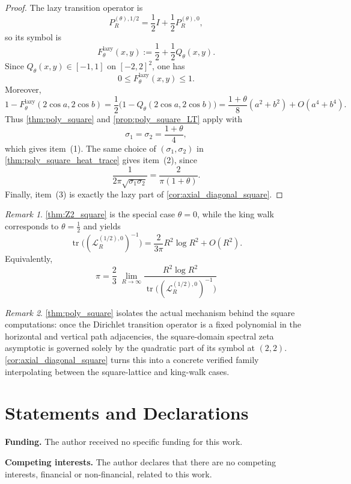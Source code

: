 \documentclass[reqno]{amsart}
\numberwithin{equation}{section}
\theoremstyle{definition}
\theoremstyle{remark}
\newtheorem{remark}[remark]{Remark}
\newcommand{\Cref}[1]{\autoref{#1}}
\DeclareMathOperator{\tr}{tr}
\begin{document}
\begin{proof}
The lazy transition operator is
\[
  P_R^{(\theta),1/2}
  =
  \frac12 I+\frac12 P_R^{(\theta),0},
\]
so its symbol is
\[
  F_\theta^{\mathrm{lazy}}(x,y)
  :=
  \frac12+\frac12 Q_\theta(x,y).
\]
Since $Q_\theta(x,y)\in[-1,1]$ on $[-2,2]^2$, one has
\[
  0\le F_\theta^{\mathrm{lazy}}(x,y)\le 1.
\]
Moreover,
\[
  1-F_\theta^{\mathrm{lazy}}(2\cos a,2\cos b)
  =
  \frac12\bigl(1-Q_\theta(2\cos a,2\cos b)\bigr)
  =
  \frac{1+\theta}{8}(a^2+b^2)+O(a^4+b^4).
\]
Thus \Cref{thm:poly_square} and \Cref{prop:poly_square_LT} apply with
\[
  \sigma_1=\sigma_2=\frac{1+\theta}{4},
\]
which gives item~(1). The same choice of $(\sigma_1,\sigma_2)$ in \Cref{thm:poly_square_heat_trace} gives item~(2), since
\[
  \frac{1}{2\pi\sqrt{\sigma_1\sigma_2}}
  =
  \frac{2}{\pi(1+\theta)}.
\]
Finally, item~(3) is exactly the lazy part of \Cref{cor:axial_diagonal_square}.
\end{proof}

\begin{remark}
\Cref{thm:Z2_square} is the special case $\theta=0$, while the king walk corresponds to $\theta=\frac12$ and yields
\[
  \tr\!\bigl((\mathcal L_R^{(1/2),0})^{-1}\bigr)
  =
  \frac{2}{3\pi}R^2\log R^2+O(R^2).
\]
Equivalently,
\begin{equation}\label{eq:King_pi}
\boxed{\;\displaystyle \pi=\frac{2}{3}\;\lim_{R\to\infty}\frac{R^{2}\log R^{2}}{\tr\!\bigl((\mathcal{L}_R^{(1/2),0})^{-1}\bigr)}\;}
\end{equation}
\end{remark}

\begin{remark}
\Cref{thm:poly_square} isolates the actual mechanism behind the square computations: once the Dirichlet transition operator is a fixed polynomial in the horizontal and vertical path adjacencies, the square-domain spectral zeta asymptotic is governed solely by the quadratic part of its symbol at $(2,2)$. \Cref{cor:axial_diagonal_square} turns this into a concrete verified family interpolating between the square-lattice and king-walk cases.
\end{remark}

\section*{Statements and Declarations}

\noindent\textbf{Funding.} The author received no specific funding for this work.

\medskip
\noindent\textbf{Competing interests.} The author declares that there are no competing interests, financial or non-financial, related to this work.
\end{document}
